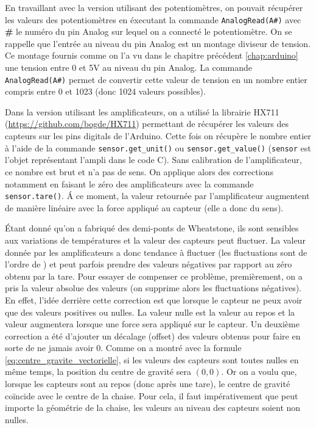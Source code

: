 \documentclass{polytech/polytech}
\begin{document}
En travaillant avec la version utilisant des potentiomètres, on pouvait récupérer les valeurs des potentiomètres en éxecutant la commande \texttt{AnalogRead(A\#)} avec \textbf{\#} le numéro du pin Analog sur lequel on a connecté le potentiomètre. On se rappelle que l'entrée au niveau du pin Analog est un montage diviseur de tension. Ce montage fournis comme on l'a vu dans le chapitre précédent \ref{chap:arduino} une tension entre 0 et 5V au niveau du pin Analog. La commande  \texttt{AnalogRead(A\#)} permet de convertir cette valeur de tension en un nombre entier compris entre 0 et 1023 (donc 1024 valeurs possibles).

Dans la version utilisant les amplificateurs, on a utilisé la librairie HX711 (\url{https://github.com/bogde/HX711}) permettant de récupérer les valeurs des capteurs sur les pins digitals de l'Arduino. 
Cette fois on récupère le nombre entier à l'aide de la commande \texttt{sensor.get\_unit()} ou \texttt{sensor.get\_value()} (\texttt{sensor} est l'objet représentant l'ampli dans le code C). 
Sans calibration de l'amplificateur, ce nombre est brut et n'a pas de sens. 
On applique alors des corrections notamment en faisant le zéro des amplificateurs avec la commande \texttt{sensor.tare()}.
 \'A ce moment, la valeur retournée par l'amplificateur augmentent de manière linéaire avec la force appliqué au capteur (elle a donc du sens).

\'Etant donné qu'on a fabriqué des demi-ponts de Wheatstone, ils sont sensibles aux variations de températures et la valeur des capteurs peut fluctuer. 
La valeur donnée par les amplificateurs a donc tendance à fluctuer (les fluctuations sont de l'ordre de ) et peut parfois prendre des valeurs négatives par rapport au zéro obtenu par la tare.
 Pour essayer de compenser ce problème, premièrement, on a pris la valeur absolue des valeurs (on supprime alors les fluctuations négatives). 
En effet, l'idée derrière cette correction est que lorsque le capteur ne peux avoir que des valeurs positives ou nulles.
 La valeur nulle est la valeur au repos et la valeur augmentera lorsque une force sera appliqué sur le capteur.
  Un deuxième correction a été d'ajouter un décalage (offset) des valeurs obtenus pour faire en sorte de ne jamais avoir 0. 
  Comme on a montré avec la formule \eqref{eq:centre_gravite_vectorielle}, si les valeurs des capteurs sont toutes nulles en même temps, la position du centre de gravité sera $(0, 0)$. 
  Or on a voulu que, lorsque les capteurs sont au repos (donc après une tare), le centre de gravité coïncide avec le centre de la chaise.
   Pour cela, il faut impérativement que peut importe la géométrie de la chaise, les valeurs au niveau des capteurs soient non nulles.
\end{document}
